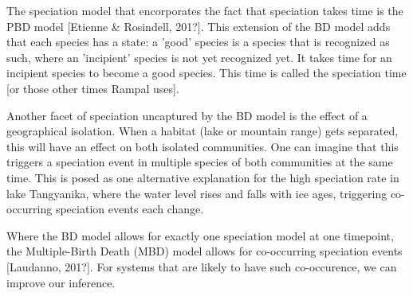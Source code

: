 %
%
%
%
%

The speciation model that encorporates the fact that speciation takes
time is the PBD model [Etienne & Rosindell, 201?]. This extension of the
BD model adds that each species has a state: a 'good' species is
a species that is recognized as such, where an 'incipient' species is
not yet recognized yet. It takes time for an incipient species to
become a good species. This time is called the speciation time [or those
other times Rampal uses].

%
%
%

Another facet of speciation uncaptured by the BD model is the
effect of a geographical isolation. When a habitat (lake or mountain range)
gets separated, this will have an effect on both isolated communities.
One can imagine that this triggers a speciation event in multiple species
of both communities at the same time. This is posed as one alternative
explanation for the high speciation rate in lake Tangyanika, where the water 
level rises and falls with ice ages, triggering co-occurring speciation
events each change. 

%
%
%

Where the BD model allows for exactly one speciation model at one timepoint,
the Multiple-Birth Death (MBD) model allows for co-occurring 
speciation events [Laudanno, 201?]. For systems that are likely
to have such co-occurence, we can improve our inference.




